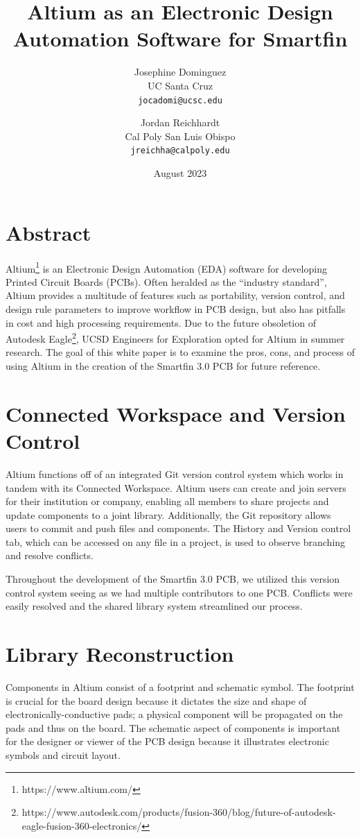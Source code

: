 \documentclass[twocolumn]{article}
\title{Altium as an Electronic Design Automation Software for Smartfin}
\author{
  Josephine Dominguez\\
  UC Santa Cruz\\
  \texttt{jocadomi@ucsc.edu}
  \and
  Jordan Reichhardt\\
  Cal Poly San Luis Obispo\\
  \texttt{jreichha@calpoly.edu}
}
\date{August 2023}
\begin{document}
\maketitle

\section*{Abstract}
Altium\footnote{https://www.altium.com/} is an Electronic Design Automation (EDA) software for developing Printed Circuit Boards (PCBs). Often heralded as the ``industry standard'', Altium provides a multitude of features such as portability, version control, and design rule parameters to improve workflow in PCB design, but also has pitfalls in cost and high processing requirements. Due to the future obsoletion of Autodesk Eagle\footnote{https://www.autodesk.com/products/fusion-360/blog/future-of-autodesk-eagle-fusion-360-electronics/}, UCSD Engineers for Exploration opted for Altium in summer research. The goal of this white paper is to examine the pros, cons, and process of using Altium in the creation of the Smartfin 3.0 PCB for future reference.

\section{Connected Workspace and Version Control}
Altium functions off of an integrated Git version control system which works in tandem with its Connected Workspace. Altium users can create and join servers for their institution or company, enabling all members to share projects and update components to a joint library. Additionally, the Git repository allows users to commit and push files and components. The History and Version control tab, which can be accessed on any file in a project, is used to observe branching and resolve conflicts.

Throughout the development of the Smartfin 3.0 PCB, we utilized this version control system seeing as we had multiple contributors to one PCB. Conflicts were easily resolved and the shared library system streamlined our process.

\section{Library Reconstruction}

Components in Altium consist of a footprint and schematic symbol. The footprint is crucial for the board design because it dictates the size and shape of electronically-conductive pads; a physical component will be propagated on the pads and thus on the board. The schematic aspect of components is important for the designer or viewer of the PCB design because it illustrates electronic symbols and circuit layout.
\end{document}
